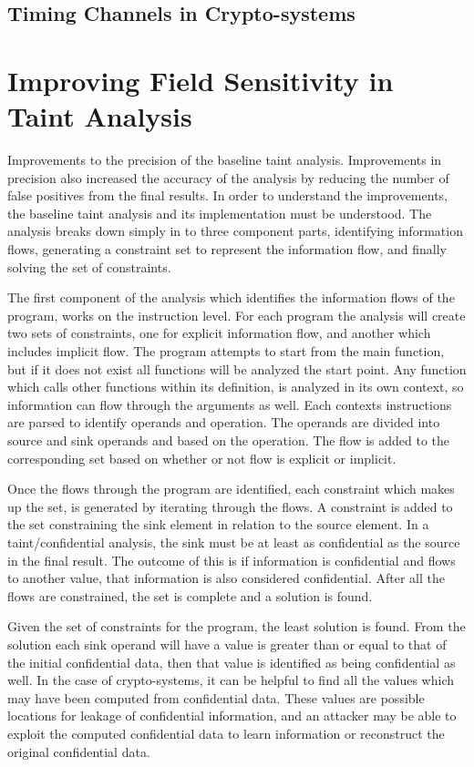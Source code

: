 \documentclass[11pt,a4paper]{article}
\begin{document}
\subsection{Timing Channels in Crypto-systems}


\section{Improving Field Sensitivity in Taint Analysis}
Improvements to the precision of the baseline taint analysis. Improvements in
precision also increased the accuracy of the analysis by reducing the number of
false positives from the final results. In order to understand the improvements,
the baseline taint analysis and its implementation must be understood. The
analysis breaks down simply in to three component parts, identifying information
flows, generating a constraint set to represent the information flow, and
finally solving the set of constraints.

The first component of the analysis which identifies the information flows of
the program, works on the instruction level. For each program the analysis will
create two sets of constraints, one for explicit information flow, and another
which includes implicit flow. The program attempts to start from the main
function, but if it does not exist all functions will be analyzed the start
point. Any function which calls other functions within its definition, is
analyzed in its own context, so information can flow through the arguments as
well. Each contexts instructions are parsed to identify operands and operation.
The operands are divided into source and sink operands and based on the
operation. The flow is added to the corresponding set based on whether or not
flow is explicit or implicit.

Once the flows through the program are identified, each constraint which makes
up the set, is generated by iterating through the flows. A constraint is added
to the set constraining the sink element in relation to the source element. In a
taint/confidential analysis, the sink must be at least as confidential as the
source in the final result. The outcome of this is if information is
confidential and flows to another value, that information is also considered
confidential. After all the flows are constrained, the set is complete and a
solution is found.

Given the set of constraints for the program, the least solution is found. From
the solution each sink operand will have a value is greater than or equal to
that of the initial confidential data, then that value is identified as being
confidential as well. In the case of crypto-systems, it can be helpful to find
all the values which may have been computed from confidential data. These values
are possible locations for leakage of confidential information, and an attacker
may be able to exploit the computed confidential data to learn information or
reconstruct the original confidential data.
\end{document}

